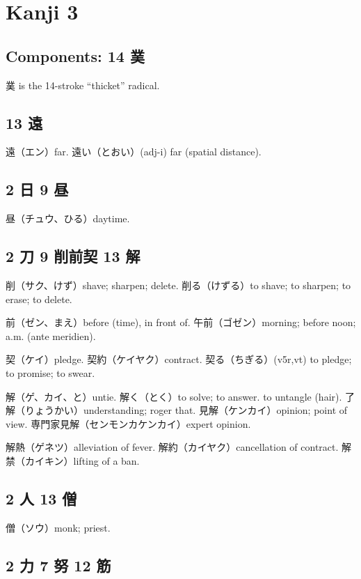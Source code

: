 \chapter{Kanji 3}

\section{Components: 14 菐}

菐 is the 14-stroke ``thicket'' radical.

\section{13 遠}

遠（エン）far.
遠い（とおい）(adj-i) far (spatial distance).

\section{2 日 9 昼}

昼（チュウ、ひる）daytime.

\section{2 刀 9 削前契 13 解}

削（サク、けず）shave; sharpen; delete.
削る（けずる）to shave; to sharpen; to erase; to delete.

前（ゼン、まえ）before (time), in front of.
午前（ゴゼン）morning; before noon; a.m. (ante meridien).

契（ケイ）pledge.
契約（ケイヤク）contract.
契る（ちぎる）(v5r,vt) to pledge; to promise; to swear.

解（ゲ、カイ、と）untie.
解く（とく）to solve; to answer. to untangle (hair).
了解（りょうかい）understanding; roger that.
見解（ケンカイ）opinion; point of view.
専門家見解（センモンカケンカイ）expert opinion.

解熱（ゲネツ）alleviation of fever.
解約（カイヤク）cancellation of contract.
解禁（カイキン）lifting of a ban.

\section{2 人 13 僧}

僧（ソウ）monk; priest.

\section{2 力 7 努 12 筋}


